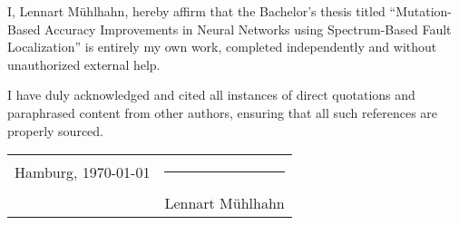 I, Lennart Mühlhahn, hereby affirm that the Bachelor's thesis titled “Mutation-Based Accuracy Improvements in Neural Networks using Spectrum-Based Fault Localization” is entirely my own work, completed independently and without unauthorized external help.

I have duly acknowledged and cited all instances of direct quotations and paraphrased content from other authors, ensuring that all such references are properly sourced.

\vspace{2cm} %

\noindent
\begin{tabular}{@{}p{}p{}@{}}
    Hamburg, \today & \hfill \rule{6cm}{1pt} \\
    & \hfill Lennart Mühlhahn %
\end{tabular}